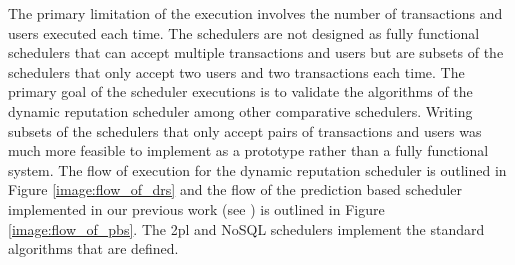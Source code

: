 The primary limitation of the execution involves the number of transactions and users executed each time. The schedulers are not designed as fully functional schedulers that can accept multiple transactions and users but are subsets of the schedulers that only accept two users and two transactions each time. The primary goal of the scheduler executions is to validate the algorithms of the dynamic reputation scheduler among other comparative schedulers. Writing subsets of the schedulers that only accept pairs of transactions and users was much more feasible to implement as a prototype rather than a fully functional system. The flow of execution for the dynamic reputation scheduler is outlined in Figure \ref{image:flow_of_drs} and the flow of the prediction based scheduler implemented in our previous work (see \cite{ravan_ensuring_2020}) is outlined in Figure \ref{image:flow_of_pbs}. The \gls{2pl} and NoSQL schedulers implement the standard algorithms that are defined.

